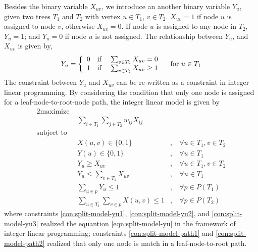 Besides the binary variable $X_{uv}$, we introduce an another binary variable $Y_u$, given two trees $T_1$ and $T_2$ with vertex $u \in T_1$, $v \in T_2$. $X_{uv} = 1$ if node $u$ is assigned to node $v$, otherwise $X_{uv} = 0$. If node $u$ is assigned to any node in $T_2$, $Y_u = 1$; and $Y_u = 0$ if node $u$ is not assigned. The relationship between $Y_u$, and $X_{uv}$ is given by,
\begin{equation}
\label{eqn:split-model-yu}
	Y_u = 
	\left\{
	\begin{array}{cc}
		0 & \text{if \quad $\sum_{v \in T_2}X_{uv} = 0$} \\
		1 & \text{if \quad $\sum_{v \in T_2}X_{uv} \ge 1$}
	\end{array}
	\right.
	\quad \text{for $u \in T_1$}
\end{equation}
The constraint between $Y_u$ and $X_{uv}$ can be re-written as a constraint in integer linear programming. 
By considering the condition that only one node is assigned for a leaf-node-to-root-node path, the integer linear model is given by
\begin{alignat}{2}
\nonumber
    \text{maximize }   \\
					   & \sum\limits_{i \in T_1}\sum\limits_{j \in T_2}w_{ij}X_{ij} \\
\nonumber
    \text{subject to } \\
					   & X(u,v) \in  \{0,1\}                   & ,\ &\forall u\in T_1, v\in T_2  \\ 
\label{con:split-model-yu1}
					   & Y(u) \in  \{0,1\}                     & ,\ &\forall u\in T_1  \\ 
\label{con:split-model-yu2}
					   & Y_u \ge X_{uv}                        & ,\ &\forall u\in T_1, v\in T_2  \\
\label{con:split-model-yu3}
					   & Y_u \le \sum\limits_{v \in T_1}X_{uv} & ,\ &\forall u\in T_1 \\
\label{con:split-model-path1}
                       & \sum\limits_{u \in p}Y_u \le 1                           & ,\ &\forall p \in P(T_1) \\
\label{con:split-model-path2}
                       & \sum\limits_{u\in T_1}\sum\limits_{v \in p} X(u,v) \le 1 & ,\ &\forall p \in P(T_2)
  \end{alignat}
where constraints \ref{con:split-model-yu1}, \ref{con:split-model-yu2}, and \ref{con:split-model-yu3} realized the equantion \ref{eqn:split-model-yu} in the framework of integer linear programming; constraints \ref{con:split-model-path1} and \ref{con:split-model-path2} realized that only one node is match in a leaf-node-to-root path.

